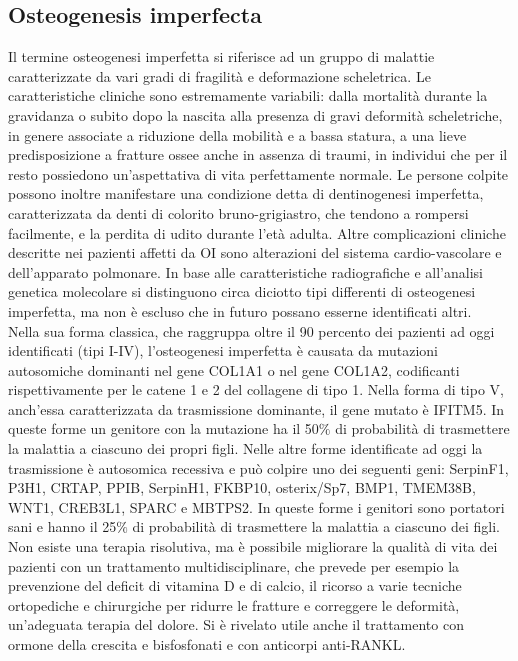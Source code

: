 \documentclass{article}
\begin{document}
\subsection{Osteogenesis imperfecta} 
Il termine osteogenesi imperfetta si riferisce ad un gruppo di malattie caratterizzate da
vari gradi di fragilità e deformazione scheletrica. Le caratteristiche cliniche sono
estremamente variabili: dalla mortalità durante la gravidanza o subito dopo la nascita alla
presenza di gravi deformità scheletriche, in genere associate a riduzione della mobilità e a
bassa statura, a una lieve predisposizione a fratture ossee anche in assenza di traumi, in
individui che per il resto possiedono un'aspettativa di vita perfettamente normale. Le
persone colpite possono inoltre manifestare una condizione detta di dentinogenesi
imperfetta, caratterizzata da denti di colorito bruno-grigiastro, che tendono a rompersi
facilmente, e la perdita di udito durante l'età adulta. Altre complicazioni cliniche descritte
nei pazienti affetti da OI sono alterazioni del sistema cardio-vascolare e dell'apparato
polmonare. In base alle caratteristiche radiografiche e all'analisi genetica molecolare si
distinguono circa diciotto tipi differenti di osteogenesi imperfetta, ma non è escluso che in
futuro possano esserne identificati altri.\\
Nella sua forma classica, che raggruppa oltre il 90 percento dei pazienti ad oggi
identificati (tipi I-IV), l'osteogenesi imperfetta è causata da mutazioni
autosomiche dominanti nel gene COL1A1 o nel gene COL1A2, codificanti
rispettivamente per le catene 1 e 2 del collagene di tipo 1. Nella forma di tipo V,
anch'essa caratterizzata da trasmissione dominante, il gene mutato è IFITM5. In
queste forme un genitore con la mutazione ha il 50$\%$ di probabilità di
trasmettere la malattia a ciascuno dei propri figli. Nelle altre forme identificate
ad oggi la trasmissione è autosomica recessiva e può colpire uno dei seguenti
geni: SerpinF1, P3H1, CRTAP, PPIB, SerpinH1, FKBP10, osterix/Sp7, BMP1,
TMEM38B, WNT1, CREB3L1, SPARC e MBTPS2. In queste forme i genitori sono
portatori sani e hanno il 25$\%$ di probabilità di trasmettere la malattia a ciascuno
dei figli.\\
Non esiste una terapia risolutiva, ma è possibile migliorare la qualità di vita
dei pazienti con un trattamento multidisciplinare, che prevede per esempio la
prevenzione del deficit di vitamina D e di calcio, il ricorso a varie tecniche
ortopediche e chirurgiche per ridurre le fratture e correggere le deformità,
un'adeguata terapia del dolore.
Si è rivelato utile anche il trattamento con ormone della crescita e bisfosfonati
e con anticorpi anti-RANKL.\\
\end{document}
